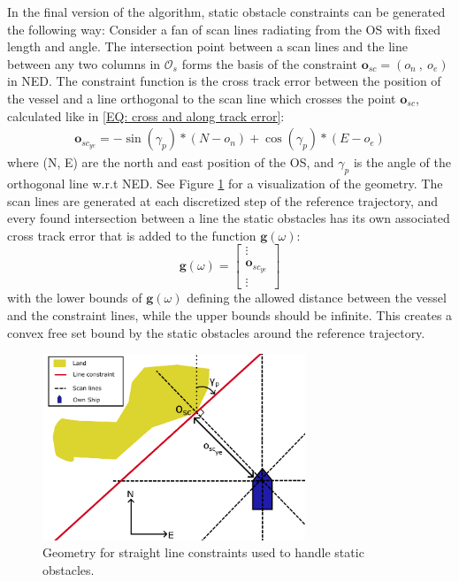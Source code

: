 In the final version of the algorithm, static obstacle constraints can be generated the following way:\newline
Consider a fan of scan lines radiating from the \gls{OS} with fixed length and angle. The intersection
point between a scan lines and the line between any two columns in $\mathcal{O}_s$ forms the basis of the constraint 
$\mathbf{o}_{sc} = (o_n \ , \ o_e)$ in NED.\newline
The constraint function is the cross track error between the position of the vessel and a line orthogonal to the scan line which crosses
the point $\mathbf{o}_{sc}$, calculated like in \eqref{EQ: cross and along track error}:
\begin{eqnarray} \label{EQ: Static ye}
    \mathbf{o}_{sc_{ye}} = -\sin(\gamma_p)*(N-o_n) + \cos(\gamma_p)*(E-o_e)
\end{eqnarray}
where (N, E) are the north and east position of the \gls{OS}, and $\gamma_p$ is the angle of the orthogonal line w.r.t NED.
See Figure \ref{FIG: static_obs_ex} for a visualization of the geometry.
The scan lines are generated at each discretized step of the reference trajectory, and every found intersection between a 
line the static obstacles has its own associated cross track error that is added to the function $\textbf{g}(\omega)$:
\begin{equation}
    \textbf{g}(\omega) = \begin{bmatrix}
        \vdots \\
        \mathbf{o}_{sc_{ye}} \\
        \vdots
    \end{bmatrix}
\end{equation}
with the lower bounds of $\textbf{g}(\omega)$ defining the allowed distance between the vessel and the constraint lines, while the upper bounds
should be infinite. This creates a convex free set bound by the static obstacles around the reference trajectory. 

\begin{figure}[th!]
    \centering
    \includegraphics[width=0.7\textwidth]{Images/StaticObs_example.pdf}
    \caption{Geometry for straight line constraints used to handle static obstacles.}
    \label{FIG: static_obs_ex}
\end{figure}

